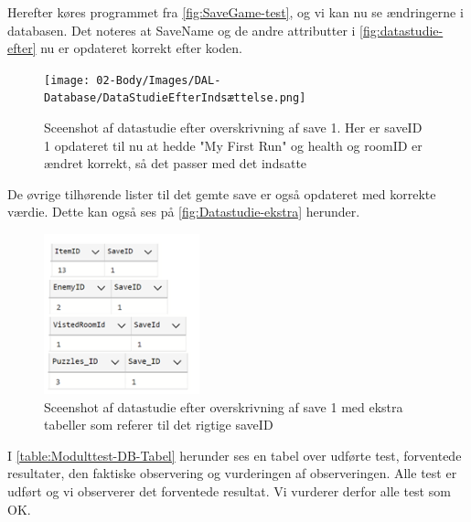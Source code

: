 Herefter køres programmet fra \autoref{fig:SaveGame-test}, og vi kan nu se ændringerne i databasen.
Det noteres at SaveName og de andre attributter i \autoref{fig:datastudie-efter} nu er opdateret korrekt efter koden.

\begin{figure}[H]
\centering
\texttt{[image: 02-Body/Images/DAL-Database/DataStudieEfterIndsættelse.png]}
\caption{Sceenshot af datastudie efter overskrivning af save 1. Her er saveID 1 opdateret til nu at hedde "My First Run" og health og roomID er ændret korrekt, så det passer med det indsatte}
\label{fig:datastudie-efter}
\end{figure}

De øvrige tilhørende lister til det gemte save er også opdateret med korrekte værdie. Dette kan også ses på \autoref{fig:Datastudie-ekstra} herunder.

\begin{figure}[H]
\centering
\includegraphics[width = 0.4\textwidth]{02-Body/Images/DAL-Database/Lister.png}
\caption{Sceenshot af datastudie efter overskrivning af save 1 med ekstra tabeller som referer til det rigtige saveID}
\label{fig:Datastudie-ekstra}
\end{figure}

I \autoref{table:Modulttest-DB-Tabel} herunder ses en tabel over udførte test, forventede resultater, den faktiske observering og vurderingen af observeringen.
Alle test er udført og vi observerer det forventede resultat. Vi vurderer derfor alle test som OK.

